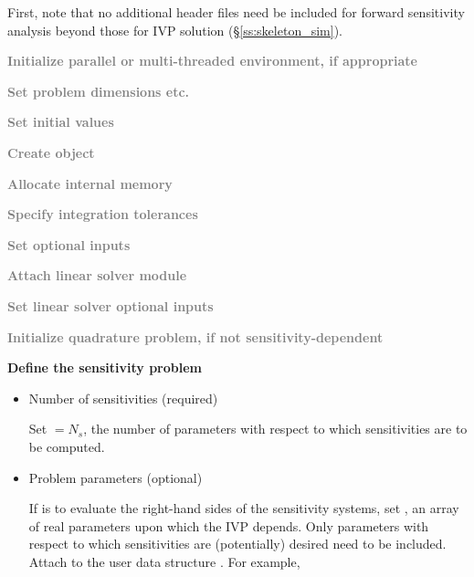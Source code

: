 First, note that no additional header files need be included for
forward sensitivity analysis beyond those for IVP solution
(\S\ref{ss:skeleton_sim}).
\begin{Steps}
  
\item 
  \textcolor{gray}{\bf Initialize parallel or multi-threaded environment,
  if appropriate}

\item
  \textcolor{gray}{\bf Set problem dimensions etc.}

\item
  \textcolor{gray}{\bf Set initial values}
 
\item
  \textcolor{gray}{\bf Create {\cvodes} object}

\item
  \textcolor{gray}{\bf Allocate internal memory}

\item
  \textcolor{gray}{\bf Specify integration tolerances}

\item
  \textcolor{gray}{\bf Set optional inputs}

\item
  \textcolor{gray}{\bf Attach linear solver module}

\item
  \textcolor{gray}{\bf Set linear solver optional inputs}

\item
  \textcolor{gray}{\bf Initialize quadrature problem, if not sensitivity-dependent}

\item \label{i:fwd_start}
  {\bf Define the sensitivity problem}

  \begin{itemize}

    \item Number of sensitivities (required)

      Set  $= N_s$, the number of parameters with respect to which sensitivities
      are to be computed.
  
    \item Problem parameters (optional)

      If {\cvodes} is to evaluate the right-hand sides of the sensitivity 
      systems, set , an array of  real parameters upon which the IVP 
      depends. Only parameters with respect to which sensitivities are (potentially) 
      desired need to be included. 
      Attach  to the user data structure . 
      For example, 


\end{itemize}
\end{Steps}
